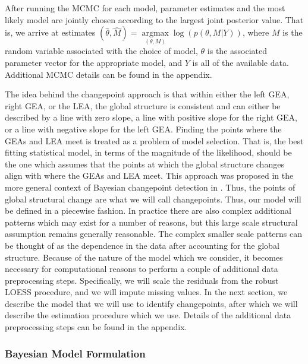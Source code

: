 \documentclass[12pt]{article}
\begin{document}
After running the MCMC for each model, parameter estimates and the most
likely model are jointly chosen according to the largest joint posterior
value. That is, we arrive at estimates
\((\hat{\theta}, \hat{M}) = \underset{(\theta, M)}{\operatorname{argmax}}{\log(p(\theta, M | Y))}\),
where \(M\) is the random variable associated with the choice of model,
\(\theta\) is the associated parameter vector for the appropriate model,
and \(Y\) is all of the available data. Additional MCMC details can be
found in the appendix.

The idea behind the changepoint approach is that within either the left
GEA, right GEA, or the LEA, the global structure is consistent and can
either be described by a line with zero slope, a line with positive
slope for the right GEA, or a line with negative slope for the left GEA.
Finding the points where the GEAs and LEA meet is treated as a problem
of model selection. That is, the best fitting statistical model, in
terms of the magnitude of the likelihood, should be the one which
assumes that the points at which the global structure changes align with
where the GEAs and LEA meet. This approach was proposed in the more
general context of Bayesian changepoint detection in
\citet{stephens1994}. Thus, the points of global structural change are
what we will call changepoints. Thus, our model will be defined in a
piecewise fashion. In practice there are also complex additional
patterns which may exist for a number of reasons, but this large scale
structural assumption remains generally reasonable. The complex smaller
scale patterns can be thought of as the dependence in the data after
accounting for the global structure. Because of the nature of the model
which we consider, it becomes necessary for computational reasons to
perform a couple of additional data preprocessing steps. Specifically,
we will scale the residuals from the robust LOESS procedure, and we will
impute missing values. In the next section, we describe the model that
we will use to identify changepoints, after which we will describe the
estimation procedure which we use. Details of the additional data
preprocessing steps can be found in the appendix.

\subsubsection{Bayesian Model Formulation}
\end{document}
